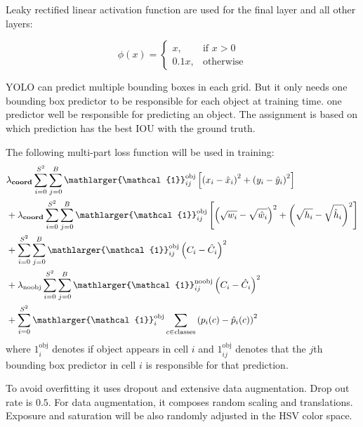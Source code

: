 \documentclass[catalog.tex]{subfiles}
\begin{document}
\smallskip
Leaky rectified linear activation function are used for the final layer and all other layers:

\begin{equation}
\phi(x) =
\begin{cases}
    x, & \text{if } x > 0\\
    0.1x, & \text{otherwise}
    \end{cases}
\end{equation}

YOLO can predict multiple bounding boxes in each grid. But it only needs one bounding box predictor to be responsible for each object at training time. one predictor well be responsible for predicting an object. The assignment is based on which prediction has the best IOU with the ground truth.

The following multi-part loss function will be used in training:
\scriptsize
\begin{align*}
&\lambda_\textbf{coord}
\sum_{i = 0}^{S^2}
    \sum_{j = 0}^{B}
     \mathlarger{\mathcal{1}}_{ij}^{\text{obj}}
            \left[
            \left(
                x_i - \hat{x}_i
            \right)^2 +
            \left(
                y_i - \hat{y}_i
            \right)^2
            \right]
\\
&+ \lambda_\textbf{coord} 
\sum_{i = 0}^{S^2}
    \sum_{j = 0}^{B}
         \mathlarger{\mathcal{1}}_{ij}^{\text{obj}}
         \left[
        \left(
            \sqrt{w_i} - \sqrt{\hat{w}_i}
        \right)^2 +
        \left(
            \sqrt{h_i} - \sqrt{\hat{h}_i}
        \right)^2
        \right]
\\
&+ \sum_{i = 0}^{S^2}
    \sum_{j = 0}^{B}
        \mathlarger{\mathcal{1}}_{ij}^{\text{obj}}
        \left(
            C_i - \hat{C}_i
        \right)^2
\\
&+ \lambda_\textrm{noobj}
\sum_{i = 0}^{S^2}
    \sum_{j = 0}^{B}
    \mathlarger{\mathcal{1}}_{ij}^{\text{noobj}}
        \left(
            C_i - \hat{C}_i
        \right)^2
\\
&+ \sum_{i = 0}^{S^2}
\mathlarger{\mathcal{1}}_i^{\text{obj}}
    \sum_{c \in \textrm{classes}}
        \left(
            p_i(c) - \hat{p}_i(c)
        \right)^2
\end{align*}
\normalsize
where $\mathcal{1}_i^{\text{obj}}$ denotes if object appears in cell $i$ and $\mathcal{1}_{ij}^{\text{obj}}$ denotes that the $j$th bounding box predictor in cell $i$ is responsible for that prediction.

To avoid overfitting it uses dropout and extensive data augmentation. Drop out rate is $0.5$. For data augmentation, it composes random scaling and translations. Exposure and saturation will be also randomly adjusted in the HSV color space.


\singlespacing
\printbibliography[title={References.},resetnumbers=true,heading=subbibliography]
\end{document}
